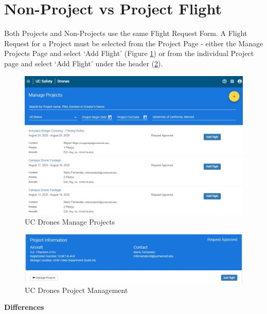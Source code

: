 \documentclass[
]{book}
\begin{document}
\hypertarget{non-project-vs-project-flight}{%
\section{Non-Project vs Project Flight}\label{non-project-vs-project-flight}}

Both Projects and Non-Projects use the same Flight Request Form. A Flight Request for a Project must be selected from the Project Page - either the Manage Projects Page and select `Add Flight' (Figure \ref{fig:UCDrones-project-flight-1}) or from the individual Project page and select `Add Flight' under the header (\ref{fig:UCDrones-project-flight-2}).

\begin{figure}

{\centering \includegraphics[width=0.85\linewidth]{images/UCDrones_manage_project} 

}

\caption{UC Drones Manage Projects}\label{fig:UCDrones-project-flight-1}
\end{figure}

\begin{figure}

{\centering \includegraphics[width=0.85\linewidth]{images/UCDrones_project_addflight} 

}

\caption{UC Drones Project Management}\label{fig:UCDrones-project-flight-2}
\end{figure}

\textbf{Differences}
\end{document}
